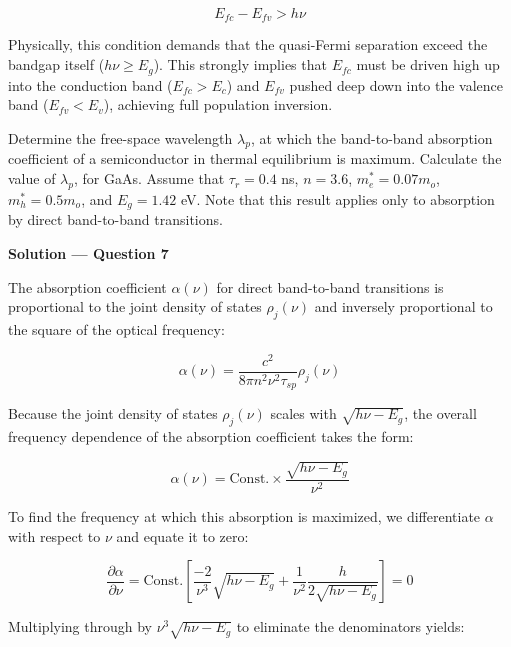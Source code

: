 \begin{equation*}
  \boxed{E_{fc} - E_{fv} > h\nu}
\end{equation*}

Physically, this condition demands that the quasi-Fermi separation exceed the bandgap itself ($h\nu \ge E_g$). This strongly implies that $E_{fc}$ must be driven high up into the conduction band ($E_{fc} > E_c$) and $E_{fv}$ pushed deep down into the valence band ($E_{fv} < E_v$), achieving full population inversion.

\begin{question}[Question 7]
Determine the free-space wavelength $\lambda_p$, at which the band-to-band absorption coefficient of a semiconductor in thermal equilibrium is maximum. Calculate the value of $\lambda_p$, for GaAs. Assume that $\tau_r = 0.4$ ns, $n = 3.6$, $m_e^* = 0.07 m_o$, $m_h^* = 0.5 m_o$, and $E_g = 1.42$ eV. Note that this result applies only to absorption by direct band-to-band transitions.
\end{question}

\textbf{\large Solution --- Question 7}

The absorption coefficient $\alpha(\nu)$ for direct band-to-band transitions is proportional to the joint density of states $\rho_j(\nu)$ and inversely proportional to the square of the optical frequency:

\begin{equation*}
  \alpha(\nu) = \frac{c^2}{8\pi n^2 \nu^2 \tau_{sp}} \rho_j(\nu)
\end{equation*}

Because the joint density of states $\rho_j(\nu)$ scales with $\sqrt{h\nu - E_g}$, the overall frequency dependence of the absorption coefficient takes the form:

\begin{equation*}
  \alpha(\nu) = \text{Const.} \times \frac{\sqrt{h\nu - E_g}}{\nu^2}
\end{equation*}

To find the frequency at which this absorption is maximized, we differentiate $\alpha$ with respect to $\nu$ and equate it to zero:

\begin{equation*}
  \frac{\partial \alpha}{\partial \nu} = \text{Const.} \left[ \frac{-2}{\nu^3} \sqrt{h\nu - E_g} + \frac{1}{\nu^2} \frac{h}{2\sqrt{h\nu - E_g}} \right] = 0
\end{equation*}

Multiplying through by $\nu^3 \sqrt{h\nu - E_g}$ to eliminate the denominators yields:

